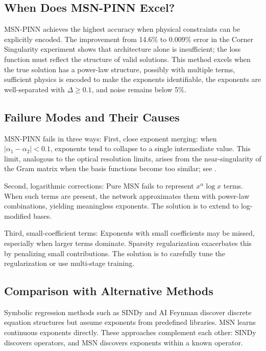 \documentclass{article}
\theoremstyle{plain}
\theoremstyle{definition}
\theoremstyle{remark}
\begin{document}
\subsection{When Does MSN-PINN Excel?}

MSN-PINN achieves the highest accuracy when physical constraints can be explicitly encoded. The improvement from 14.6\% to 0.009\% error in the Corner Singularity experiment shows that architecture alone is insufficient; the loss function must reflect the structure of valid solutions. This method excels when the true solution has a power-law structure, possibly with multiple terms, sufficient physics is encoded to make the exponents identifiable, the exponents are well-separated with $\Delta \geq 0.1$, and noise remains below 5\%.

\subsection{Failure Modes and Their Causes}

MSN-PINN fails in three ways: First, close exponent merging: when $|\alpha_1 - \alpha_2| < 0.1$, exponents tend to collapse to a single intermediate value. This limit, analogous to the optical resolution limits, arises from the near-singularity of the Gram matrix when the basis functions become too similar; see .

Second, logarithmic corrections: Pure MSN fails to represent $x^\alpha \log x$ terms. When such terms are present, the network approximates them with power-law combinations, yielding meaningless exponents. The solution is to extend to log-modified bases.

Third, small-coefficient terms: Exponents with small coefficients may be missed, especially when larger terms dominate. Sparsity regularization exacerbates this by penalizing small contributions. The solution is to carefully tune the regularization or use multi-stage training.

\subsection{Comparison with Alternative Methods}

Symbolic regression methods such as SINDy and AI Feynman discover discrete equation structures but assume exponents from predefined libraries. MSN learns continuous exponents directly. These approaches complement each other: SINDy discovers operators, and MSN discovers exponents within a known operator.
\end{document}
